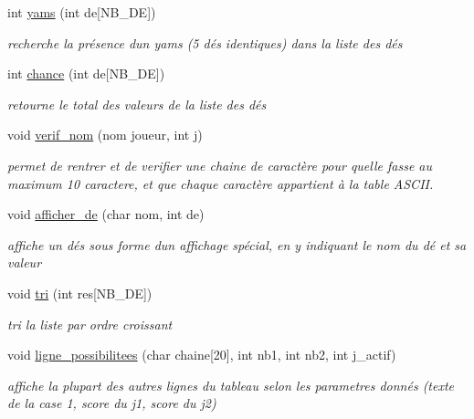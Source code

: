 \begin{DoxyCompactItemize}
int \mbox{\hyperlink{yams___cleo___martin-_colleu__2_80_8c_ab9d432a650d9fe11c52fdac9aeb8847e}{yams}} (int de\mbox{[}N\+B\+\_\+\+DE\mbox{]})
\begin{DoxyCompactList}\small\item\em recherche la présence d\textquotesingle{}un yams (5 dés identiques) dans la liste des dés \end{DoxyCompactList}\item 
int \mbox{\hyperlink{yams___cleo___martin-_colleu__2_80_8c_ab6c13f2b7be7ec56df645329e87c6929}{chance}} (int de\mbox{[}N\+B\+\_\+\+DE\mbox{]})
\begin{DoxyCompactList}\small\item\em retourne le total des valeurs de la liste des dés \end{DoxyCompactList}\item 
void \mbox{\hyperlink{yams___cleo___martin-_colleu__2_80_8c_a1229fccbb203e81f1130f89c0a68683f}{verif\+\_\+nom}} (nom joueur, int j)
\begin{DoxyCompactList}\small\item\em permet de rentrer et de verifier une chaine de caractère pour qu\textquotesingle{}elle fasse au maximum 10 caractere, et que chaque caractère appartient à la table A\+S\+C\+II. \end{DoxyCompactList}\item 
void \mbox{\hyperlink{yams___cleo___martin-_colleu__2_80_8c_aca54a84a82c247dc378a6396bbe2fbc1}{afficher\+\_\+de}} (char nom, int de)
\begin{DoxyCompactList}\small\item\em affiche un dés sous forme d\textquotesingle{}un affichage spécial, en y indiquant le nom du dé et sa valeur \end{DoxyCompactList}\item 
void \mbox{\hyperlink{yams___cleo___martin-_colleu__2_80_8c_a187b6be1bce27cb32c9a632b7411394a}{tri}} (int res\mbox{[}N\+B\+\_\+\+DE\mbox{]})
\begin{DoxyCompactList}\small\item\em tri la liste par ordre croissant \end{DoxyCompactList}\item 
void \mbox{\hyperlink{yams___cleo___martin-_colleu__2_80_8c_aa40182218f7ed8b1a8c5b6ecd9072790}{ligne\+\_\+possibilitees}} (char chaine\mbox{[}20\mbox{]}, int nb1, int nb2, int j\+\_\+actif)
\begin{DoxyCompactList}\small\item\em affiche la plupart des autres lignes du tableau selon les parametres donnés (texte de la case 1, score du j1, score du j2) \end{DoxyCompactList}\item 

\end{DoxyCompactItemize}
